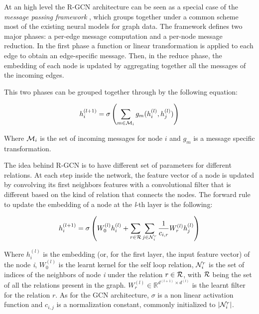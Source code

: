 \documentclass[%
    corpo=13.5pt,
    twoside,
    oldstyle,
    tipotesi=magistrale,
    greek,
    evenboxes
]{toptesi}
\begin{document}
At an high level the R-GCN architecture can be seen as a special case of
the \emph{message passing framework} \cite{gilmer2017}, which groups together
under a common scheme most of the existing neural models for graph data.
The framework defines two major phases: a per-edge message computation and a
per-node message reduction.
In the first phase a function or linear transformation is applied to each edge
to obtain an edge-specific message.
Then, in the reduce phase, the embedding of each node is updated by aggregating
together all the messages of the incoming edges.

This two phases can be grouped together through by the following equation:

\begin{equation}
    h_i^{(l+1)} = \sigma \left(
            \sum_{m\in{\CMcal{M}_i}} g_m(h_i^{(l)}, h_j^{(l)})
        \right)
\end{equation}

Where $\CMcal{M}_i$ is the set of incoming messages for node $i$ and
$g_m$ is a message specific transformation.
\newline

The idea behind R-GCN is to have different set of parameters
for different relations.
At each step inside the network, the feature vector of a node is updated by
convolving its first neighbors features with a convolutional filter that is
different based on the kind of relation that connects the nodes.
The forward
rule to update the embedding of a node at the \emph{l}-th layer is the following:

\begin{equation}
    h^{(l+1)}_{i} = \sigma \left(
        W_0^{(l)}h_i^{(l)} + \sum_{r\in\CMcal{R}}\sum_{j\in\CMcal{N}_i^r}
        \frac{1}{c_{i,r}} W_r^{(l)} h_j^{(l)}
    \right)
\end{equation}

Where $h_i^{(l)}$ is the embedding (or, for the first layer, the input feature
vector) of the node \emph{i}, $W_0^{(l)}$ is the learnt kernel for the
self loop relation, $\CMcal{N}_i^r$ is the
set of indices of the neighbors of node \emph{i} under the relation
$r\in\CMcal{R}$, with $\CMcal{R}$ being the set of all the relations present in
the graph. $W_r^{(l)}\in\mathbb{R}^{d^{(l+1)}\times d^{(l)}}$ is the learnt
filter for the relation $r$. As for the GCN architecture, $\sigma$ is a non
linear activation function and $c_{i,j}$ is a normalization constant, commonly
initialized to $|\CMcal{N}_i^r|$.
\end{document}
